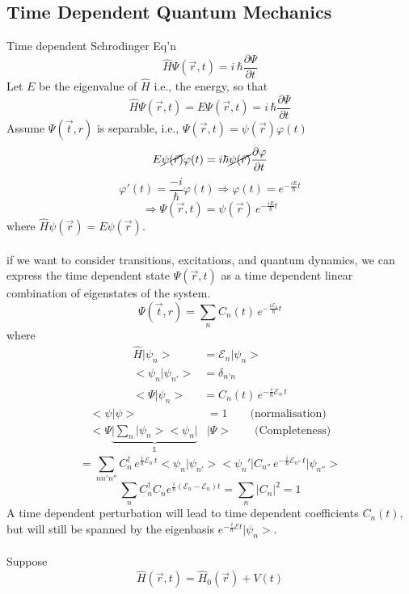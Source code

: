 \documentclass[12pt,fancychapters]{report}
\numberwithin{equation}{section}
\begin{document}
\subsection{Time Dependent Quantum Mechanics}
Time dependent Schrodinger Eq'n 
\[
  \hat{H}\Psi(\vec{r}, t) = i\,\hbar\frac{\partial \Psi}{\partial t} 
\]
Let $E$ be the eigenvalue of $\hat{H}$ i.e., the energy, so that 
\[
  \hat{H}\Psi(\vec{r}, t) = E\Psi(\vec{r}, t) = i\,\hbar\frac{\partial \Psi}{\partial t}
\]
Assume $\Psi(\vec{t}, r)$ is separable, i.e., $\Psi(\vec{r}, t) = \psi(\vec{r})\varphi(t)$
\[
  E\cancel{\psi(\vec{r})}\varphi(t) = i\hbar\cancel{\psi(\vec{r})}\frac{\partial \varphi}{\partial t}
\]
\[
  \varphi'(t) = \frac{-i}{\hbar}\varphi(t) \Rightarrow \varphi(t) = e^{-\frac{iE}{\hbar}t}
\]
\[
  \Rightarrow \Psi(\vec{r}, t) = \psi(\vec{r})\,e^{-\frac{iE}{\hbar}t}
\]
where $\hat{H}\psi(\vec{r}) = E\psi(\vec{r})$.\\
\\
if we want to consider transitions, excitations, and quantum dynamics, we can express the time 
dependent state $\Psi(\vec{r}, t)$ as a time dependent linear combination of eigenstates of the 
system. 
\[
  \Psi(\vec{t}, r) = \sum_n C_n(t)\,e^{-\frac{i\mathcal{E}_n}{\hbar}t}
\]
where 
\begin{align*}
  \hat{H}\big|\psi_n\big> &= \mathcal{E}_n\big|\psi_n\big>\\
  \big<\psi_n\big|\psi_{n'}\big> &= \delta_{n'n}\\
  \big<\Psi\big|\psi_n\big> &= C_n(t)\,e^{-\frac{i}{\hbar}\mathcal{E}_n\,t}
\end{align*}
\begin{align*}
  \big<\psi\big|\psi\big> &= 1 \qquad \text{(normalisation)}\\
  \big<\Psi\underbrace{\big|\sum_n\big|\psi_n\big>\big<\psi_n\big|}_{\mathbb{1}}&\big|\Psi\big> \qquad
  \text{(Completeness)}
\end{align*}
\[
  = \sum_{nn'n''}C^{\dagger}_n\,e^{\frac{i}{\hbar}\mathcal{E}_n\,t}\big<\psi_n\big|\psi_{n'}\big>
  \big<\psi_n'\big|C_{n''}\,e^{-\frac{i}{\hbar}\mathcal{E}_{n''}\,t}\big|\psi_{n''}\big>
\]
\[
  \sum_n C^\dagger_n C_n e^{\frac{i}{\hbar}(\mathcal{E}_n - \mathcal{E}_n)t} 
  = \sum_n \big|C_n\big|^2 = 1 
\]
A time dependent perturbation will lead to time dependent coefficients $C_n(t)$, but will still
be spanned by the eigenbasis $e^{-\frac{i}{\hbar}\mathcal{E}t}\big|\psi_n\big>$.\\
\\
Suppose 
\[
  \hat{H}(\vec{r}, t) = \hat{H}_0(\vec{r}) + V(t)
\]
\end{document}
